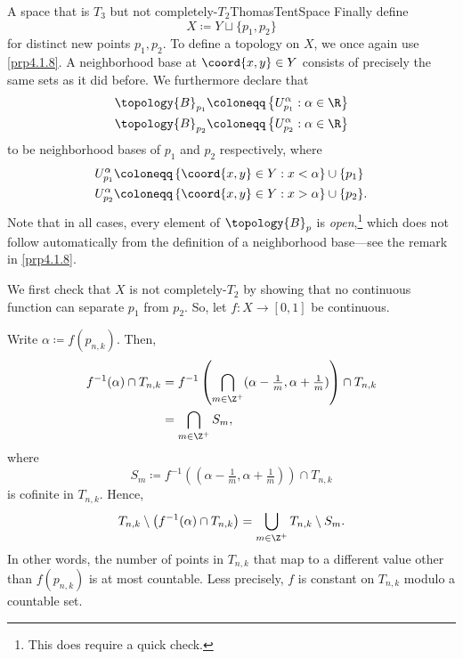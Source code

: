 \begin{exm}{A space that is $T_3$ but not completely-$T_2$}{ThomasTentSpace}
Finally define
\begin{equation}
X\coloneqq Y\sqcup \{ p_1,p_2\}
\end{equation}
for distinct new points $p_1,p_2$.  To define a topology on $X$, we once again use \cref{prp4.1.8}.  A neighborhood base at $\coord{x,y}\in Y$ consists of precisely the same sets as it did before.  We furthermore declare that
\begin{equation}
\begin{split}
\topology{B}_{p_1} & \coloneqq \left\{ U_{p_1}^\alpha :\alpha \in \R \right\} \\
\topology{B}_{p_2} & \coloneqq \left\{ U_{p_2}^\alpha :\alpha \in \R \right\}
\end{split}
\end{equation}
to be neighborhood bases of $p_1$ and $p_2$ respectively, where
\begin{equation}
\begin{split}
U_{p_1}^\alpha & \coloneqq \left\{ \coord{x,y}\in Y:x<\alpha \right\} \cup \{ p_1\} \\
U_{p_2}^\alpha & \coloneqq \left\{ \coord{x,y}\in Y:x>\alpha \right\} \cup \{ p_2\} .
\end{split}
\end{equation}
Note that in all cases, every element of $\topology{B}_p$ is \emph{open},\footnote{This does require a quick check.} which does not follow automatically from the definition of a neighborhood base---see the remark in \cref{prp4.1.8}.

We first check that $X$ is not completely-$T_2$ by showing that no continuous function can separate $p_1$ from $p_2$.  So, let $f\colon X\rightarrow [0,1]$ be continuous.

Write $\alpha \coloneqq f(p_{n,k})$.  Then,
\begin{equation*}
\begin{split}
f^{-1}(\alpha )\cap T_{n,k} & =f^{-1}\left( \bigcap _{m\in \Z ^+}(\alpha -\tfrac{1}{m},\alpha +\tfrac{1}{m})\right) \cap T_{n,k} \\
& =\bigcap _{m\in \Z ^+}S_m,
\end{split}
\end{equation*}
where
\begin{equation}
S_m\coloneqq f^{-1}((\alpha -\tfrac{1}{m},\alpha +\tfrac{1}{m}))\cap T_{n,k}
\end{equation}
is cofinite in $T_{n,k}$.  Hence,
\begin{equation}
T_{n,k}\setminus \left( f^{-1}(\alpha )\cap T_{n,k}\right) =\bigcup _{m\in \Z ^+}T_{n,k}\setminus S_m.
\end{equation}
In other words, the number of points in $T_{n,k}$ that map to a different value other than $f(p_{n,k})$ is at most countable.  Less precisely, $f$ is constant on $T_{n,k}$ modulo a countable set.


\end{exm}
